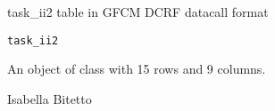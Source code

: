 \documentclass[a4paper]{book}
\begin{document}
%
\begin{Description}\relax
task\_ii2 table in GFCM DCRF datacall format
\end{Description}
%
\begin{Usage}
\begin{verbatim}
task_ii2
\end{verbatim}
\end{Usage}
%
\begin{Format}
An object of class  with 15 rows and 9 columns.
\end{Format}
%
\begin{Author}\relax
Isabella Bitetto 
\end{Author}
\printindex{}
\end{document}
